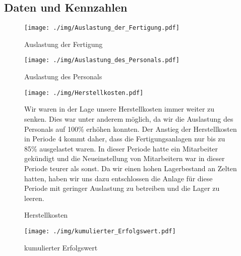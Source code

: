 \documentclass[a4paper, 12pt]{report}
\begin{document}
\begin{flushleft}
\chapter{Daten und Kennzahlen}
 
 \begin{figure}[th]
 \centering 
 \texttt{[image: ./img/Auslastung\_der\_Fertigung.pdf]}
 \caption[Auslastung der Fertigung]{Auslastung der Fertigung}
  \texttt{[image: ./img/Auslastung\_des\_Personals.pdf]}
  \caption[Auslastung des Personals]{Auslastung des Personals}  
\end{figure}

 
 \begin{figure}[th]
 \centering 
 \texttt{[image: ./img/Herstellkosten.pdf]}
  \caption[Herstellkosten]{Herstellkosten}
\begin{flushleft}
Wir waren in der Lage unsere Herstellkosten immer weiter zu senken. Dies war unter anderem möglich, da wir die Auslastung des Personals auf 100\% erhöhen konnten. 
Der Anstieg der Herstellkosten in Periode 4 kommt daher, dass die Fertigungsanlagen nur bis zu 85\% ausgelastet waren.
In dieser Periode hatte ein Mitarbeiter gekündigt und die Neueinstellung von Mitarbeitern war in dieser Periode teurer als sonst.
Da wir einen hohen Lagerbestand an Zelten hatten, haben wir uns dazu entschlossen die Anlage für diese Periode mit geringer Auslastung zu betreiben und die Lager zu leeren.
\end{flushleft}
\end{figure}




 \begin{figure}[b]
 \centering 
 \texttt{[image: ./img/kumulierter\_Erfolgswert.pdf]}
  \caption[kumulierter Erfolgswert]{kumulierter Erfolgswert}
\end{figure}
 

\end{flushleft}
\end{document}
